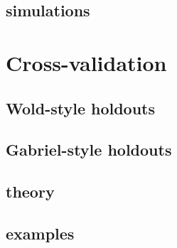 \documentclass{beamer}
\begin{document}
\subsection{simulations}

\section{Cross-validation}
\subsection{Wold-style holdouts}
\subsection{Gabriel-style holdouts}
\subsection{theory}
\subsection{examples}


\begin{frame}
\end{frame}
\end{document}

